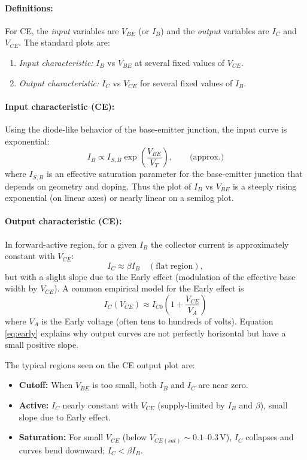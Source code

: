 \documentclass[12pt,a4paper]{article}
\begin{document}
\paragraph{Definitions:}
For CE, the \emph{input} variables are $V_{BE}$ (or $I_B$) and the \emph{output} variables are $I_C$ and $V_{CE}$. The standard plots are:
\begin{enumerate}
  \item \emph{Input characteristic:} $I_B$ vs $V_{BE}$ at several fixed values of $V_{CE}$.  
  \item \emph{Output characteristic:} $I_C$ vs $V_{CE}$ for several fixed values of $I_B$.
\end{enumerate}

\paragraph{Input characteristic (CE):}
Using the diode-like behavior of the base-emitter junction, the input curve is exponential:
\begin{equation}
  I_B \propto I_{S,B} \exp\left(\frac{V_{BE}}{V_T}\right),\qquad \text{(approx.)}\label{eq:ib_vbe}
\end{equation}
where $I_{S,B}$ is an effective saturation parameter for the base-emitter junction that depends on geometry and doping. Thus the plot of $I_B$ vs $V_{BE}$ is a steeply rising exponential (on linear axes) or nearly linear on a semilog plot.

\paragraph{Output characteristic (CE):}
In forward-active region, for a given $I_B$ the collector current is approximately constant with $V_{CE}$:
\begin{equation}
  I_C \approx \beta I_B \quad(\text{flat} \;\text{region}),\label{eq:ic_flat}
\end{equation}
but with a slight slope due to the Early effect (modulation of the effective base width by $V_{CE}$). A common empirical model for the Early effect is
\begin{equation}
  I_C(V_{CE}) \approx I_{C0}\left(1+\frac{V_{CE}}{V_A}\right)\label{eq:early}
\end{equation}
where $V_A$ is the Early voltage (often tens to hundreds of volts). Equation \eqref{eq:early} explains why output curves are not perfectly horizontal but have a small positive slope.

The typical regions seen on the CE output plot are:
\begin{itemize}
  \item \textbf{Cutoff:} When $V_{BE}$ is too small, both $I_B$ and $I_C$ are near zero.
  \item \textbf{Active:} $I_C$ nearly constant with $V_{CE}$ (supply-limited by $I_B$ and $\beta$), small slope due to Early effect.
  \item \textbf{Saturation:} For small $V_{CE}$ (below $V_{CE(sat)}\sim 0.1$--$0.3\,$V), $I_C$ collapses and curves bend downward; $I_C < \beta I_B$.
\end{itemize}
\end{document}
